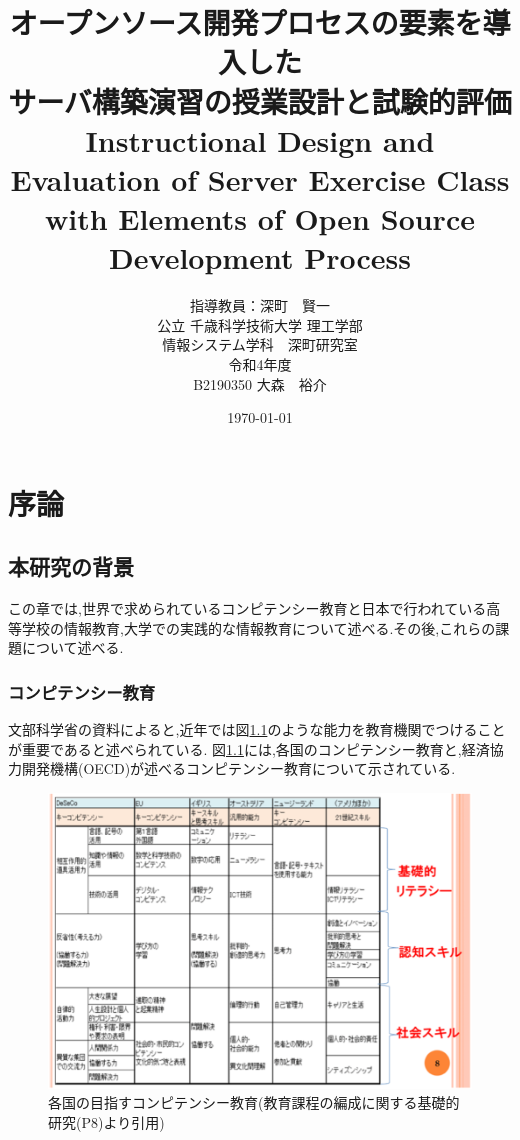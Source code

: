 \documentclass[11pt, a4paper]{jreport}
\begin{document}
\title{オープンソース開発プロセスの要素を導入した\\サーバ構築演習の授業設計と試験的評価\\Instructional Design and Evaluation of Server Exercise Class with Elements of Open Source Development Process}
\author{指導教員：深町　賢一\\
公立 千歳科学技術大学 理工学部\\
情報システム学科　深町研究室\\
令和4年度\\
B2190350 大森　裕介}
\date{\today}

\maketitle
{}
\tableofcontents

\chapter{序論}
\section{本研究の背景}

この章では,世界で求められているコンピテンシー教育と日本で行われている高等学校の情報教育,大学での実践的な情報教育について述べる.その後,これらの課題について述べる.

\subsection{コンピテンシー教育}\label{conpi}

文部科学省の資料によると,近年では図\ref{fig:oecd1}のような能力を教育機関でつけることが重要であると述べられている. 図\ref{fig:oecd1}には,各国のコンピテンシー教育と,経済協力開発機構(OECD)が述べるコンピテンシー教育について示されている\cite{bib:oecd}.

\begin{figure}[H]
\begin{center}
\includegraphics[width=140mm]{./img/oecd.png}
\caption{各国の目指すコンピテンシー教育(教育課程の編成に関する基礎的研究(P8)より引用)}
\label{fig:oecd1}
\end{center}
\end{figure}
\end{document}
